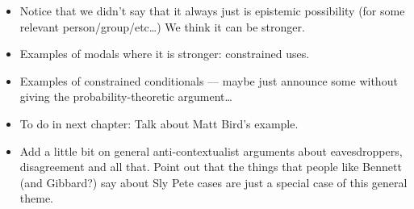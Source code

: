 \documentclass[If.tex]{subfiles}
\begin{document}
\begin{itemize}
	\item
	Notice that we didn't say that it always just is epistemic possibility (for some relevant person/group/etc\ldots{}) We think it can be stronger.
	\item
	Examples of modals where it is stronger: constrained uses.
	\item
	Examples of constrained conditionals --- maybe just announce some without giving the probability-theoretic argument\ldots{}
	\item
	To do in next chapter: Talk about Matt Bird's example.
	\item
	Add a little bit on general anti-contextualist arguments about eavesdroppers, disagreement and all that. Point out that the things that people like Bennett (and Gibbard?) say about Sly Pete cases are just a special case of this general theme.
\end{itemize}
\end{document}

